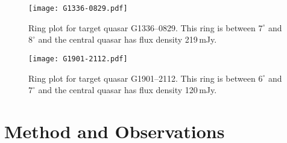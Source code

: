 		\begin{figure}[h]
			\centering
			\texttt{[image: G1336-0829.pdf]} 
			\caption[G1336-0829 Ring Plot]{Ring plot for target quasar G1336--0829. This ring is between $7^\circ$ and $8^\circ$ and the central quasar has flux density 219\,mJy.}
			\label{j1336ring}
		\end{figure}
		
		\begin{figure}[h]
			\centering
			\texttt{[image: G1901-2112.pdf]} 
			\caption[G1901-2121 Ring Plot]{Ring plot for target quasar G1901--2112. This ring is between $6^\circ$ and $7^\circ$ and the central quasar has flux density 120\,mJy.}
			\label{j1901ring}
		\end{figure}
		
    
\clearpage	
\section{Method and Observations}
